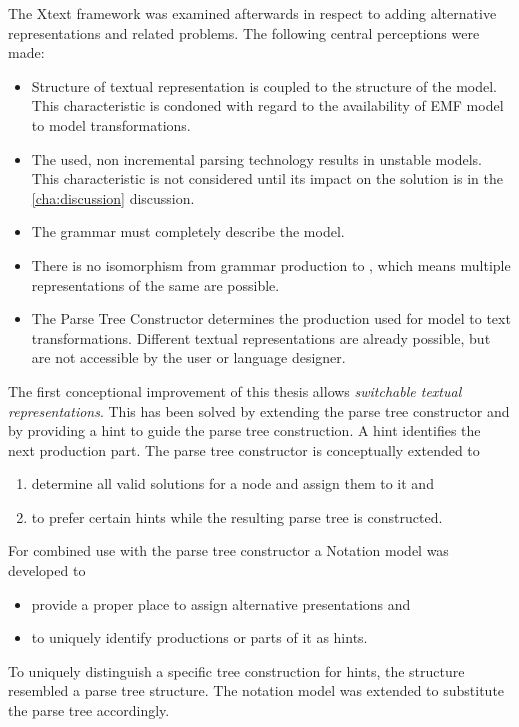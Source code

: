 The Xtext framework was examined afterwards in respect to adding alternative representations and related problems. The following central perceptions were made:
\begin{itemize}
	\item Structure of textual representation is coupled to the structure of the model. This characteristic is condoned with regard to the availability of EMF model to model transformations.
	\item The used, non incremental parsing technology results in unstable models. This characteristic is not considered until its impact on the solution is in the \ref{cha:discussion} discussion.
	\item The grammar must completely describe the model. 
	\item There is no isomorphism from grammar production to , which means multiple representations of the same  are possible.
	\item The Parse Tree Constructor determines the production used for model to text transformations. Different textual representations are already possible, but are not accessible by the user or language designer. \\
\end{itemize}
 
 
The first conceptional improvement of this thesis allows \emph{switchable textual representations}. This has been solved by extending the parse tree constructor and by providing a hint to guide the parse tree construction. A hint identifies the next production part.
The parse tree constructor is conceptually extended to
\begin{enumerate}
	\item determine all valid solutions for a node and assign them to it and
	\item to prefer certain hints while the resulting parse tree is constructed.
\end{enumerate}
For combined use with the parse tree constructor a Notation model was developed to
\begin{itemize}
	\item provide a proper place to assign alternative presentations and
	\item to uniquely identify productions or parts of it as hints.
\end{itemize}
To uniquely distinguish a specific tree construction for hints, the structure resembled a parse tree structure. The notation model was extended to substitute the parse tree accordingly.\\


